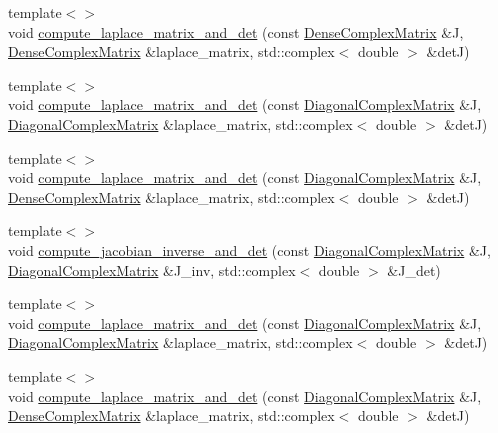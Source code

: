 \begin{DoxyCompactItemize}
\item 
{\footnotesize template$<$$>$ }\\void \hyperlink{classoomph_1_1PMLElementBase_a82a06fb2a00950d79074f3c60a7a5b2f}{compute\+\_\+laplace\+\_\+matrix\+\_\+and\+\_\+det} (const \hyperlink{classoomph_1_1DenseComplexMatrix}{Dense\+Complex\+Matrix} \&J, \hyperlink{classoomph_1_1DenseComplexMatrix}{Dense\+Complex\+Matrix} \&laplace\+\_\+matrix, std\+::complex$<$ double $>$ \&detJ)
\item 
{\footnotesize template$<$$>$ }\\void \hyperlink{classoomph_1_1PMLElementBase_a654f2ef095100243e53adbd6cbd28bb4}{compute\+\_\+laplace\+\_\+matrix\+\_\+and\+\_\+det} (const \hyperlink{classoomph_1_1DiagonalComplexMatrix}{Diagonal\+Complex\+Matrix} \&J, \hyperlink{classoomph_1_1DiagonalComplexMatrix}{Diagonal\+Complex\+Matrix} \&laplace\+\_\+matrix, std\+::complex$<$ double $>$ \&detJ)
\item 
{\footnotesize template$<$$>$ }\\void \hyperlink{classoomph_1_1PMLElementBase_a9df56eb6843f56183ebbd71808916964}{compute\+\_\+laplace\+\_\+matrix\+\_\+and\+\_\+det} (const \hyperlink{classoomph_1_1DiagonalComplexMatrix}{Diagonal\+Complex\+Matrix} \&J, \hyperlink{classoomph_1_1DenseComplexMatrix}{Dense\+Complex\+Matrix} \&laplace\+\_\+matrix, std\+::complex$<$ double $>$ \&detJ)
\item 
{\footnotesize template$<$$>$ }\\void \hyperlink{classoomph_1_1PMLElementBase_a946a80214c8260e515a2e2b6a2717305}{compute\+\_\+jacobian\+\_\+inverse\+\_\+and\+\_\+det} (const \hyperlink{classoomph_1_1DiagonalComplexMatrix}{Diagonal\+Complex\+Matrix} \&J, \hyperlink{classoomph_1_1DiagonalComplexMatrix}{Diagonal\+Complex\+Matrix} \&J\+\_\+inv, std\+::complex$<$ double $>$ \&J\+\_\+det)
\item 
{\footnotesize template$<$$>$ }\\void \hyperlink{classoomph_1_1PMLElementBase_a7239f8944d825c5f8bf85c5c79aac128}{compute\+\_\+laplace\+\_\+matrix\+\_\+and\+\_\+det} (const \hyperlink{classoomph_1_1DiagonalComplexMatrix}{Diagonal\+Complex\+Matrix} \&J, \hyperlink{classoomph_1_1DiagonalComplexMatrix}{Diagonal\+Complex\+Matrix} \&laplace\+\_\+matrix, std\+::complex$<$ double $>$ \&detJ)
\item 
{\footnotesize template$<$$>$ }\\void \hyperlink{classoomph_1_1PMLElementBase_ae23acdf6fabb2225e3f938ee407b04a1}{compute\+\_\+laplace\+\_\+matrix\+\_\+and\+\_\+det} (const \hyperlink{classoomph_1_1DiagonalComplexMatrix}{Diagonal\+Complex\+Matrix} \&J, \hyperlink{classoomph_1_1DenseComplexMatrix}{Dense\+Complex\+Matrix} \&laplace\+\_\+matrix, std\+::complex$<$ double $>$ \&detJ)

\end{DoxyCompactItemize}
